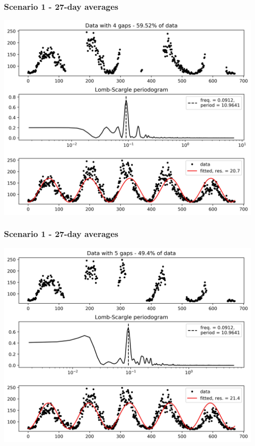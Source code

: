 \documentclass{beamer}
\begin{document}
\begin{frame}
\frametitle{Scenario 1 - 27-day averages}
\begin{center}
\includegraphics[scale=0.55]{../scripts/dataset2/periodograms_ny2.0_model2_Ng4.jpg}
\end{center}
\end{frame}
\begin{frame}
\frametitle{Scenario 1 - 27-day averages}
\begin{center}
\includegraphics[scale=0.55]{../scripts/dataset2/periodograms_ny2.0_model2_Ng5.jpg}
\end{center}
\end{frame}
\end{document}
